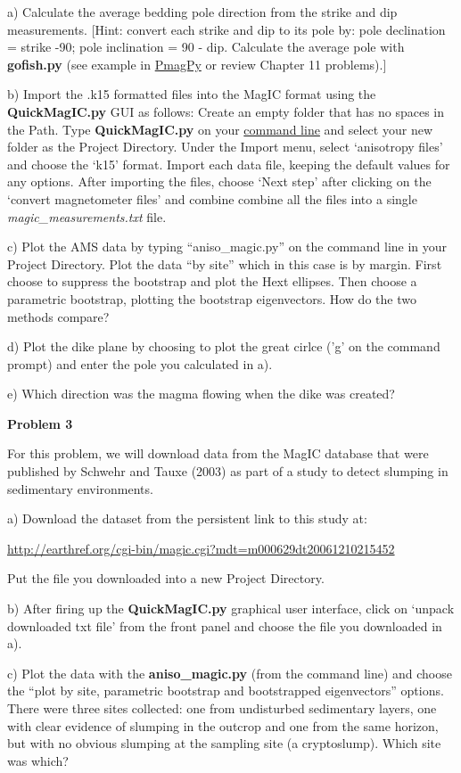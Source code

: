 {a) Calculate the average bedding pole direction from the strike and dip measurements.  [Hint:  convert each strike and dip to its pole by: pole declination = strike -90; pole inclination = 90 - dip.
Calculate the average pole with {\bf gofish.py} (see example in \href{http://earthref.org/PmagPy/cookbook/#gofish.py}{PmagPy} or review Chapter 11 problems).]  

b)  Import the .k15 formatted files into the MagIC format using the {\bf QuickMagIC.py} GUI as follows:  Create an empty folder that has no spaces in the Path.   Type {\bf QuickMagIC.py} on your \href{http://earthref.org/PmagPy/cookbook/#command_line}{command  line} and select your new folder as the Project Directory.    Under the  Import menu, select `anisotropy files' and choose the   `k15' format.  Import each data file, keeping the default values for any options.  After importing the files, choose `Next step' after clicking on the `convert magnetometer files' and combine combine all the files into a single {\it magic\_measurements.txt} file.     

c)   Plot the AMS data by typing ``aniso\_magic.py'' on the command line in your Project Directory.  Plot the data ``by site'' which in this case is by margin.  First choose to suppress the bootstrap and plot the Hext ellipses.  Then choose a parametric bootstrap, plotting the bootstrap eigenvectors.     How do the two methods compare?   


d) Plot the dike plane by choosing to plot the great cirlce ('g' on the command prompt) and enter the pole you calculated in a).   

e) Which direction was the magma flowing when the dike was created?  


{\bf Problem 3}

For this problem, we will download data from the MagIC database that were published by Schwehr and Tauxe (2003) as part of a study to detect slumping in sedimentary environments.   
\nocite{schwehr03}

a)  Download the  dataset from  the persistent link to this study at:

\url{http://earthref.org/cgi-bin/magic.cgi?mdt=m000629dt20061210215452}

Put the file you downloaded into a  new Project Directory.

b)   After firing up the {\bf QuickMagIC.py} graphical user interface, click on `unpack downloaded txt file' from the front panel and choose the file you downloaded in a). 

c) Plot the data with the {\bf aniso\_magic.py} (from the command line) and choose the  ``plot by site, parametric bootstrap and bootstrapped eigenvectors'' options.  There were three sites collected:  one from  undisturbed sedimentary layers,  one with clear evidence of slumping in the outcrop and one from the same horizon, but with no obvious slumping at the sampling site (a cryptoslump).  Which site was which?  
}
%
